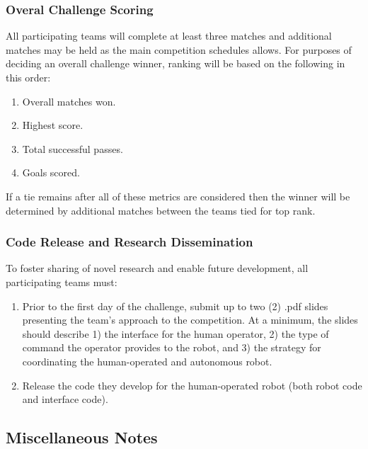 \subsubsection{Overal Challenge Scoring}
All participating teams will complete at least three matches and additional matches may be held as the main competition schedules allows. For purposes of deciding an overall challenge winner, ranking will be based on the following in this order:
\begin{enumerate}
	\item Overall matches won.
	\item Highest score.
	\item Total successful passes.
	\item Goals scored.
\end{enumerate}
If a tie remains after all of these metrics are considered then the winner will be determined by additional matches between the teams tied for top rank.

\subsubsection{Code Release and Research Dissemination}
To foster sharing of novel research and enable future development, all participating teams must:
\begin{enumerate}
	\item Prior to the first day of the challenge, submit up to two (2) .pdf slides presenting the team's approach to the competition. At a minimum, the slides should describe 1) the interface for the human operator, 2) the type of command the operator provides to the robot, and 3) the strategy for coordinating the human-operated and autonomous robot.
	\item  Release the code they develop for the human-operated robot (both robot code and interface code).
\end{enumerate}

\subsection{Miscellaneous Notes}


